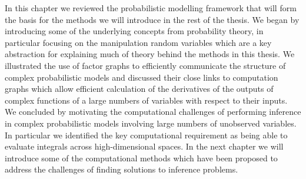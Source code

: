 In this chapter we reviewed the probabilistic modelling framework that will form the basis for the methods we will introduce in the rest of the thesis. We began by introducing some of the underlying concepts from probability theory, in particular focusing on the manipulation random variables which are a key abstraction for explaining much of theory behind the methods in this thesis.  We illustrated the use of factor graphs to efficiently communicate the structure of complex probabilistic models and discussed their close links to computation graphs which allow efficient calculation of the derivatives of the outputs of complex functions of a large numbers of variables with respect to their inputs. We concluded by motivating the computational challenges of performing inference in complex probabilistic models involving large numbers of unobserved variables. In particular we identified the key computational requirement as being able to evaluate integrals across high-dimensional spaces. In the next chapter we will introduce some of the computational methods which have been proposed to address the challenges of finding solutions to inference problems.

